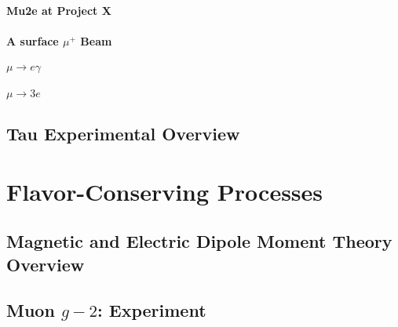 \subsubsection{Mu2e at Project X}
\vskip -12pt


\subsubsection{A surface $\mu^+$ Beam}
\vskip -12pt


\subsubsection{$\mu \to e \gamma$}
\vskip -12pt


\subsubsection{$\mu \to 3e$}
\vskip -12pt



\section{Tau Experimental Overview}\label{sec:cl:tauexp}
\vskip -12pt

%


\chapter{Flavor-Conserving Processes}\label{sec:cl:fcp}
\medskip
\section{Magnetic and Electric Dipole Moment Theory Overview}\label{sec:cl:fct}
\vskip -12pt


\section{Muon $g-2$:  Experiment}
\vskip -12pt


